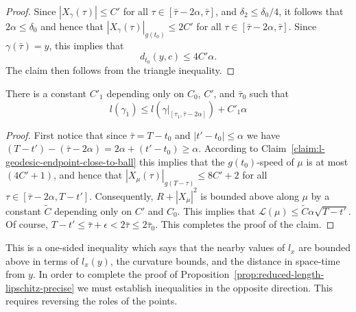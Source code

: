 \begin{proof}
\sketch
Since $|X_\gamma(\tau)|\le C'$ for all $\tau\in
[\bar\tau-2\alpha,\bar\tau]$, and  $\delta_2\le \delta_0/4$, it
follows that $2\alpha\le \delta_0$ and hence that
$|X_\gamma(\tau)|_{g(t_0)}\le 2C'$ for all  $\tau\in
[\bar\tau-2\alpha,\bar\tau]$. Since $\gamma(\bar\tau)=y$, this
implies that
$$d_{t_0}(y,c)\le 4C'\alpha.$$
The claim then follows from the triangle inequality.
\end{proof}

\begin{claim}\label{claim:l-length-concatenation-bound}

There is a constant $C'_1$ depending only on
$C_0$, $C'$, and $\bar\tau_0$ such that
$$l(\gamma_1)\le l(\gamma|_{[\tau_1,\bar\tau-2\alpha]})+C'_1\alpha$$
\end{claim}

\begin{proof}
\sketch
First notice that since $\bar\tau=T-t_0$ and $|t'-t_0|\le \alpha$ we have
$(T-t')-(\bar\tau-2\alpha)=2\alpha+(t'-t_0)\ge \alpha$. According to
Claim~\ref{claim:l-geodesic-endpoint-close-to-ball} this implies that the $g(t_0)$-speed of $\mu$ is at most
$(4C'+1)$, and hence  that $|X_{\mu}(\tau)|_{g(T-\tau)}\le 8C'+2$ for all
$\tau\in [\bar\tau-2\alpha,T-t']$. Consequently, $R+|X_\mu|^2$ is bounded above
along $\mu$ by a constant $\widetilde C$ depending only on $C'$ and $C_0$. This
implies that ${\mathcal L}(\mu)\le \widetilde C\alpha\sqrt{T-t'}$. Of course,
$T-t'\le \bar\tau+\epsilon<2\bar\tau\le 2\bar\tau_0$. This completes the proof
of the claim.
\end{proof}

This is a one-sided inequality which says that the nearby values of
$l_x$ are bounded above in terms of  $l_x(y)$, the curvature bounds,
and the distance in space-time from $y$. In order to complete the
proof of Proposition~\ref{prop:reduced-length-lipschitz-precise} we must establish inequalities in
the opposite direction. This requires reversing the roles of the
points.


